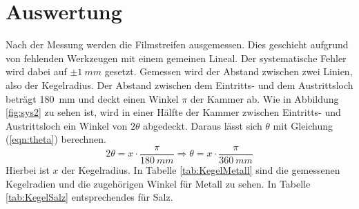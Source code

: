 ﻿\section{Auswertung}
\label{sec:Auswertung}

Nach der Messung werden die Filmstreifen ausgemessen. Dies geschieht aufgrund von fehlenden Werkzeugen mit einem gemeinen Lineal. Der systematische Fehler wird dabei auf $\pm\SI{1}{mm}$ gesetzt. Gemessen wird der Abstand zwischen zwei Linien, also der Kegelradius. Der Abstand zwischen dem Eintritts- und dem Austrittsloch beträgt \SI{180}{mm} und deckt einen Winkel $\pi$ der Kammer ab. Wie in Abbildung \ref{fig:sys2} zu sehen ist, wird in einer Hälfte der Kammer zwischen Eintritts- und Austrittsloch ein Winkel von $2\theta$ abgedeckt. Daraus lässt sich $\theta$ mit Gleichung (\ref{eqn:theta}) berechnen.
\begin{equation}
\label{eqn:theta}
	2\theta = x \cdot \frac{\pi}{\SI{180}{mm}} \Longrightarrow \theta = x \cdot \frac{\pi}{\SI{360}{mm}}
\end{equation}
Hierbei ist $x$ der Kegelradius. In Tabelle \ref{tab:KegelMetall} sind die gemessenen Kegelradien und die zugehörigen Winkel für Metall zu sehen. In Tabelle \ref{tab:KegelSalz} entsprechendes für Salz.
%
